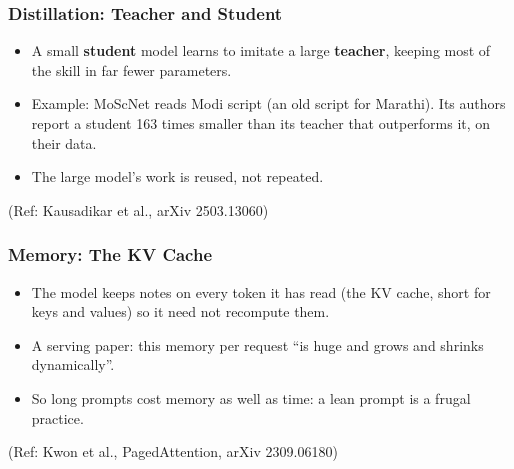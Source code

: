 \begin{frame}[fragile]\frametitle{Distillation: Teacher and Student}
\begin{center}
\end{center}
\begin{itemize}
\item A small \textbf{student} model learns to imitate a large \textbf{teacher}, keeping most of the skill in far fewer parameters.
\item Example: MoScNet reads Modi script (an old script for Marathi). Its authors report a student 163 times smaller than its teacher that outperforms it, on their data.
\item The large model's work is reused, not repeated.
\end{itemize}
{\tiny (Ref: Kausadikar et al., arXiv 2503.13060)}
\end{frame}

\begin{frame}[fragile]\frametitle{Memory: The KV Cache}
\begin{itemize}
\item The model keeps notes on every token it has read (the KV cache, short for keys and values) so it need not recompute them.
\item A serving paper: this memory per request ``is huge and grows and shrinks dynamically''.
\item So long prompts cost memory as well as time: a lean prompt is a frugal practice.
\end{itemize}
{\tiny (Ref: Kwon et al., PagedAttention, arXiv 2309.06180)}
\end{frame}

